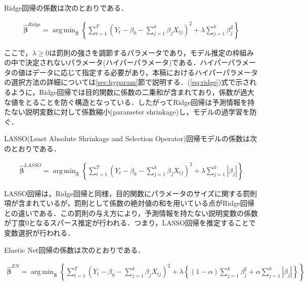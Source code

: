 \documentclass[a4paper，12pt]{jsarticle}
\DeclareMathOperator*{\argmin}{arg\,min}
\begin{document}
Ridge回帰の係数は次のとおりである．

\begin{equation} \label{eq:ridge}
  \begin{split}
    \hat{\bm{\beta}}^{Ridge} = \argmin_{\bm{\beta}}\left\{ \sum_{t=1}^{T} \left( Y_t - \beta_0 - \sum_{j=1}^{k} \beta_{j} X_{tj} \right)^2 + \lambda \sum_{j=1}^{k} \beta_{j}^{2} \right\}
  \end{split}
\end{equation}

ここで，$\lambda \geq 0$は罰則の強さを調節するパラメータであり，モデル推定の枠組みの中で決定されないパラメータ(ハイパーパラメータ)である．ハイパーパラメータの値はデータに応じて指定する必要があり，本稿におけるハイパーパラメータの選択方法の詳細については\ref{sec:hyparam}節で説明する．(\ref{eq:ridge})式で示されるように，Ridge回帰では目的関数に係数の二乗和が含まれており，係数が過大な値をとることを防ぐ構造となっている．したがってRidge回帰は予測情報を持たない説明変数に対して係数縮小(parameter shrinkage)し，モデルの過学習を防ぐ．

LASSO(Least Absolute Shrinkage and Selection Operator)回帰モデルの係数は次のとおりである．

\begin{equation} \label{eq:lasso}
  \begin{split}
    \hat{\bm{\beta}}^{LASSO} = \argmin_{\bm{\beta}}\left\{ \sum_{t=1}^{T} \left( Y_t - \beta_0 - \sum_{j=1}^{k} \beta_{j} X_{tj} \right)^2 + \lambda \sum_{j=1}^{k} \left|\beta_{j}\right| \right\}
  \end{split}
\end{equation}

LASSO回帰は，Ridge回帰と同様，目的関数にパラメータのサイズに関する罰則項が含まれているが，罰則として係数の絶対値の和を用いている点がRidge回帰との違いである．この罰則の与え方により，予測情報を持たない説明変数の係数が丁度0となるスパース推定が行われる．つまり，LASSO回帰を推定することで変数選択が行われる．

Elastic Net回帰の係数は次のとおりである．

\begin{equation}
  \begin{split}
    \hat{\bm{\beta}}^{EN} = \argmin_{\bm{\beta}}\left\{ \sum_{t=1}^{T} \left( Y_t - \beta_0 - \sum_{j=1}^{k} \beta_{j} X_{tj} \right)^2 + 
    \lambda \left\{ 
      \left( 1 - \alpha \right) \sum_{j=1}^{k} \beta_{j}^2 + 
      \alpha \sum_{j=1}^{k} \left|\beta_{j}\right| 
      \right\} 
    \right\}
  \end{split}
\end{equation}
\end{document}
